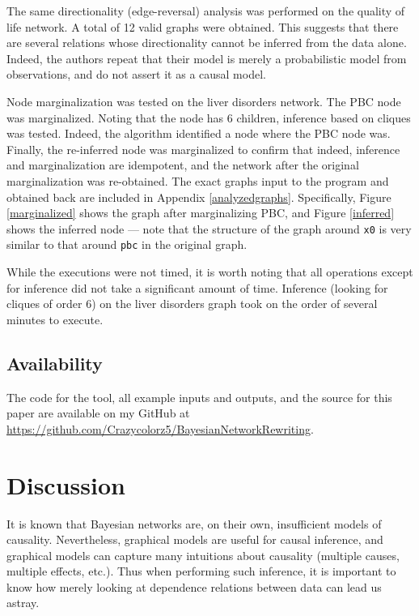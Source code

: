\documentclass{article}
\begin{document}
	The same directionality (edge-reversal) analysis was performed on the quality of life network.
	A total of 12 valid graphs were obtained.
	This suggests that there are several relations whose directionality cannot be inferred from the data alone.
	Indeed, the authors repeat that their model is merely a probabilistic model from observations, and do not assert it as a causal model.
	
	Node marginalization was tested on the liver disorders network. The PBC node was marginalized.
	Noting that the node has 6 children, inference based on cliques was tested.
	Indeed, the algorithm identified a node where the PBC node was.
	Finally, the re-inferred node was marginalized to confirm that indeed, inference and marginalization are idempotent, and the network after the original marginalization was re-obtained.
	The exact graphs input to the program and obtained back are included in Appendix \ref{analyzedgraphs}.
	Specifically, Figure \ref{marginalized} shows the graph after marginalizing PBC, and Figure \ref{inferred} shows the inferred node --- note that the structure of the graph around \verb|x0| is very similar to that around \verb|pbc| in the original graph.
	
	While the executions were not timed, it is worth noting that all operations except for inference did not take a significant amount of time.
	Inference (looking for cliques of order 6) on the liver disorders graph took on the order of several minutes to execute.
	
	
	\subsection{Availability}
	The code for the tool, all example inputs and outputs, and the source for this paper are available on my GitHub at \url{https://github.com/Crazycolorz5/BayesianNetworkRewriting}.
	
	\section{Discussion}
	\label{discussion}
	
	It is known that Bayesian networks are, on their own, insufficient models of causality.
	Nevertheless, graphical models are useful for causal inference, and graphical models can capture many intuitions about causality (multiple causes, multiple effects, etc.).
	Thus when performing such inference, it is important to know how merely looking at dependence relations between data can lead us astray.
	
\end{document}
